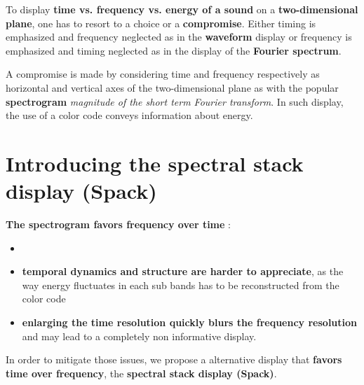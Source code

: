 \documentclass[a0,portrait,15pt]{a0poster}
\begin{document}
\begin{multicols}{2}
To display \textbf{time vs. frequency vs. energy of a sound} on a \textbf{two-dimensional plane}, one has to resort to a choice or a \textbf{compromise}. Either timing is emphasized and frequency neglected as in the \textbf{waveform} display or frequency is emphasized  and timing neglected  as in the display of the \textbf{Fourier spectrum}.

A compromise is made by considering time and frequency respectively as horizontal and vertical axes of the two-dimensional plane as with the popular \textbf{spectrogram} \textit{magnitude of the short term Fourier transform}. In such display, the use of a color code conveys information about energy.

\color{DarkSlateGray} %

\section*{Introducing the spectral stack display (Spack)}

\textbf{The spectrogram favors frequency over time} :
\begin{itemize}
  \item
  \item \textbf{temporal dynamics and structure are harder to appreciate}, as the way energy fluctuates in each sub bands has to be reconstructed from the color code
  \item \textbf{enlarging the time resolution quickly blurs the frequency resolution} and may lead to a completely non informative display.
\end{itemize}

In order to mitigate those issues, we propose a alternative display that \textbf{favors time over frequency}, the \textbf{spectral stack display (Spack)}.



\begin{center}\vspace{1cm}
\end{center}\vspace{1cm}


\end{multicols}
\end{document}
